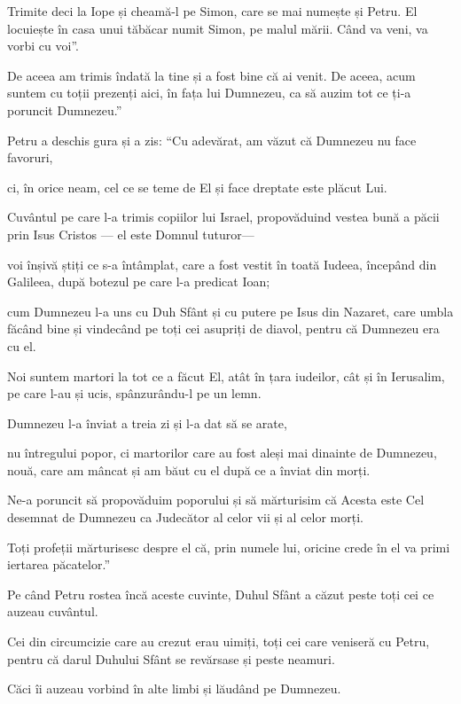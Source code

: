 {Trimite deci la Iope și cheamă-l pe Simon, care se mai numește și Petru. El locuiește în casa unui tăbăcar numit Simon, pe malul mării. Când va veni, va vorbi cu voi”.

De aceea am trimis îndată la tine și a fost bine că ai venit. De aceea, acum suntem cu toții prezenți aici, în fața lui Dumnezeu, ca să auzim tot ce ți-a poruncit Dumnezeu.”


\par }{\PP {}Petru a deschis gura și a zis: “Cu adevărat, am văzut că Dumnezeu nu face favoruri,

ci, în orice neam, cel ce se teme de El și face dreptate este plăcut Lui.

Cuvântul pe care l-a trimis copiilor lui Israel, propovăduind vestea bună a păcii prin Isus Cristos — el este Domnul tuturor—

voi înșivă știți ce s-a întâmplat, care a fost vestit în toată Iudeea, începând din Galileea, după botezul pe care l-a predicat Ioan;

cum Dumnezeu l-a uns cu Duh Sfânt și cu putere pe Isus din Nazaret, care umbla făcând bine și vindecând pe toți cei asupriți de diavol, pentru că Dumnezeu era cu el.

Noi suntem martori la tot ce a făcut El, atât în țara iudeilor, cât și în Ierusalim, pe care l-au și ucis, spânzurându-l pe un lemn.

Dumnezeu l-a înviat a treia zi și l-a dat să se arate,

nu întregului popor, ci martorilor care au fost aleși mai dinainte de Dumnezeu, nouă, care am mâncat și am băut cu el după ce a înviat din morți.

Ne-a poruncit să propovăduim poporului și să mărturisim că Acesta este Cel desemnat de Dumnezeu ca Judecător al celor vii și al celor morți.

Toți profeții mărturisesc despre el că, prin numele lui, oricine crede în el va primi iertarea păcatelor.”


\par }{\PP {}Pe când Petru rostea încă aceste cuvinte, Duhul Sfânt a căzut peste toți cei ce auzeau cuvântul.

Cei din circumcizie care au crezut erau uimiți, toți cei care veniseră cu Petru, pentru că darul Duhului Sfânt se revărsase și peste neamuri.

Căci îi auzeau vorbind în alte limbi și lăudând pe Dumnezeu.

}
